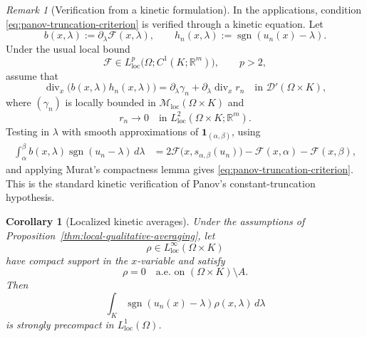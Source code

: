 \documentclass[11pt]{amsart}
\numberwithin{equation}{section}
\theoremstyle{plain}
\newtheorem{corollary}[theorem]{Corollary}
\theoremstyle{definition}
\theoremstyle{remark}
\newtheorem{remark}[theorem]{Remark}
\begin{document}
\begin{remark}[Verification from a kinetic formulation]
\label{rem:kinetic-verification-panov}
In the applications, condition
\eqref{eq:panov-truncation-criterion} is verified through a kinetic equation.
Let
\[
    b(x,\lambda):=\partial_\lambda\mathcal F(x,\lambda),
    \qquad
    h_n(x,\lambda):=\operatorname{sgn}(u_n(x)-\lambda).
\]
Under the usual local bound
\[
    \mathcal F\in
    L^p_{\mathrm{loc}}
    \bigl(\Omega;C^1(K;\mathbb R^m)\bigr),
    \qquad p>2,
\]
assume that
\begin{equation}
\label{eq:kinetic-verification-panov}
    \operatorname{div}_x
    \bigl(b(x,\lambda)h_n(x,\lambda)\bigr)
    =
    \partial_\lambda\gamma_n
    +
    \partial_\lambda\operatorname{div}_x r_n
    \quad\text{in }\mathcal D'(\Omega\times K),
\end{equation}
where \((\gamma_n)\) is locally bounded in
\(\mathcal M_{\mathrm{loc}}(\Omega\times K)\) and
\[
    r_n\to0
    \quad\text{in }
    L^2_{\mathrm{loc}}(\Omega\times K;\mathbb R^m).
\]
Testing in \(\lambda\) with smooth approximations of
\(\mathbf 1_{(\alpha,\beta)}\), using
\begin{equation}
\label{eq:flux-truncation-identity}
\begin{aligned}
    \int_\alpha^\beta
        b(x,\lambda)
        \operatorname{sgn}(u_n-\lambda)\,d\lambda
    &=
    2\mathcal F\bigl(x,s_{\alpha,\beta}(u_n)\bigr)
    -\mathcal F(x,\alpha)-\mathcal F(x,\beta),
\end{aligned}
\end{equation}
and applying Murat's compactness lemma gives
\eqref{eq:panov-truncation-criterion}.  This is the standard kinetic
verification of Panov's constant-truncation hypothesis.
\end{remark}

\begin{corollary}[Localized kinetic averages]
\label{cor:weights-supported-in-A}
Under the assumptions of
Proposition~\ref{thm:local-qualitative-averaging}, let
\[
    \rho\in L^\infty_{\mathrm{loc}}(\Omega\times K)
\]
have compact support in the \(x\)-variable and satisfy
\[
    \rho=0
    \quad\text{a.e. on }(\Omega\times K)\setminus A.
\]
Then
\begin{equation}
\label{eq:localized-weighted-average}
    \int_K
        \operatorname{sgn}(u_n(x)-\lambda)
        \rho(x,\lambda)\,d\lambda
\end{equation}
is strongly precompact in \(L^1_{\mathrm{loc}}(\Omega)\).
\end{corollary}
\end{document}

